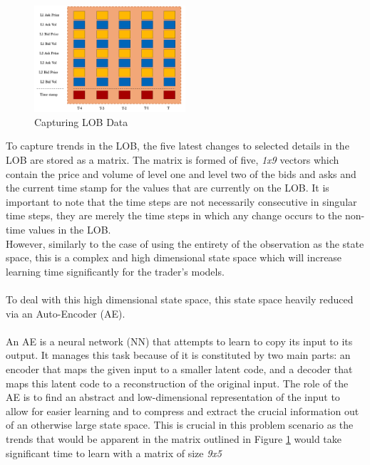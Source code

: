 \documentclass[ %
                    author={Ashwinder Khurana},
                supervisor={Prof Dave Cliff},
                    degree={MEng},
                     title={The Deeply Reinforced Trader},
                  subtitle={},
                      type={enterprise},
                      year={2020} ]{dissertation}
\begin{document}
{\begin{figure}[H]
	\centering
  	\includegraphics[width=0.5\textwidth]{LOB-Snapshot.png}
 	\caption{Capturing LOB Data}
	\label{fig:LOB-Snapshot}  
\end{figure}
\noindent
To capture trends in the LOB, the five latest changes to selected details in the LOB are stored as a matrix. The matrix is formed of five, \textit{1x9} vectors which contain the price and volume of level one and level two of the bids and asks and the current time stamp for the values that are currently on the LOB. It is important to note that the time steps are not necessarily consecutive in singular time steps, they are merely the time steps in which any change occurs to the non-time values in the LOB. 
\\
However, similarly to the case of using the entirety of the observation as the state space, this is a complex and high dimensional state space which will increase learning time significantly for the trader's models.  
\\
\\
To deal with this high dimensional state space, this state space heavily reduced via an Auto-Encoder (AE). 
\\
\\
An AE is a neural network (NN) that attempts to learn to copy its input to its output. It manages this task because of it is constituted by two main parts: an encoder that maps the given input to a smaller latent code, and a decoder that maps this latent code to a reconstruction of the original input. The role of the AE is to find an abstract and low-dimensional representation of the input to allow for easier learning and to compress and extract the crucial information out of an otherwise large state space. This is crucial in this problem scenario as the trends that would be apparent in the matrix outlined in Figure \ref{fig:LOB-Snapshot} would take significant time to learn with a matrix of size \textit{9x5}
\\
\\
\\
}
\end{document}
